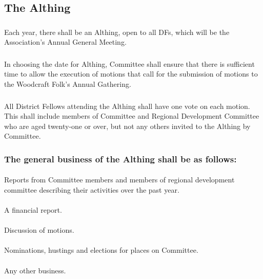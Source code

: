 \documentclass[a4paper, 12pt]{article}
\begin{document}
\subsection{The Althing}
\subsubsection{}
Each year, there shall be an Althing, open to all DFs, which will be the  Association’s Annual General Meeting.
\subsubsection{}
In choosing the date for Althing, Committee shall ensure that there is sufficient time to allow the execution of motions that call for the submission of motions to the Woodcraft Folk’s Annual Gathering.
\subsubsection{}
All District Fellows attending the Althing shall have one vote on each motion.  This shall include members of Committee and Regional Development Committee who are aged twenty-one or over, but not any others invited to the Althing by Committee.
\subsubsection{The general business of the Althing shall be as follows:}
\paragraph{}
Reports from Committee members and members of regional development committee describing their activities over the past year.
\paragraph{}
A financial report.
\paragraph{}
Discussion of motions.
\paragraph{}
Nominations, hustings and elections for places on Committee.
\paragraph{}
Any other business.
\end{document}
